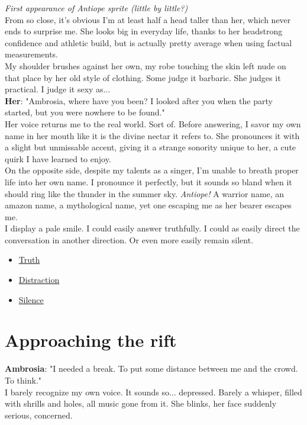 \documentclass{report}
\newcommand{\dcomment}[1]{
	\emph{#1}
	\\
}
\newcommand{\speaker}[1]{
	\textbf{#1}: 
}
\newcommand{\glink}[2]{
	\hyperref[#1]{#2}
}
\newcommand{\gsection}[1]{
	\section*{#1}
	\label{#1}
}
\begin{document}
\dcomment{
	First appearance of Antiope sprite (little by little?)
}

From so close, it's obvious I'm at least half a head taller than her, which never ends to surprise me. She looks big in everyday life, thanks to her headstrong confidence and athletic build, but is actually pretty average when using factual measurements.\\

My shoulder brushes against her own, my robe touching the skin left nude on that place by her old style of clothing. Some judge it barbaric. She judges it practical. I judge it sexy as...\\

\speaker{Her} "Ambrosia, where have you been? I looked after you when the party started, but you were nowhere to be found."\\

Her voice returns me to the real world. Sort of. Before answering, I savor my own name in her mouth like it is the divine nectar it refers to. She pronounces it with a slight but unmissable accent, giving it a strange sonority unique to her, a cute quirk I have learned to enjoy.\\

On the opposite side, despite my talents as a singer, I'm unable to breath proper life into her own name. I pronounce it perfectly, but it sounds so bland when it should ring like the thunder in the summer sky. \emph{Antiope!} A warrior name, an amazon name, a mythological name, yet one escaping me as her bearer escapes me.\\

I display a pale smile. I could easily answer truthfully. I could as easily direct the conversation in another direction. Or even more easily remain silent.

\begin{itemize}
	\item \glink{Approaching the rift}{Truth}
	\item \glink{Sport}{Distraction}
	\item \glink{Silence}{Silence}
\end{itemize}

\gsection{Approaching the rift}

\speaker{Ambrosia} "I needed a break. To put some distance between me and the crowd. To think."\\

I barely recognize my own voice. It sounds so... depressed. Barely a whisper, filled with shrills and holes, all music gone from it. She blinks, her face suddenly serious, concerned.\\
\end{document}
